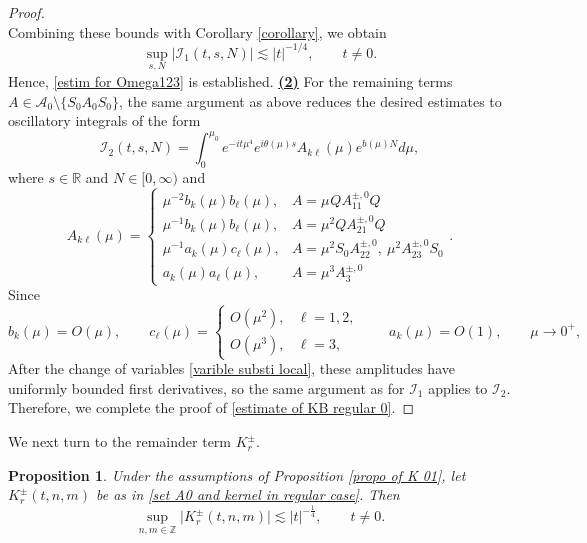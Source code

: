 \documentclass[reqno, 11pt]{amsart}
\newtheorem{proposition}[definition]{Proposition}
\newcommand\R{\mathbb{R}}
\newcommand\Z{\mathbb{Z}}
\newcommand\mcaI{\mathcal{I}}
\newcommand\mcaA{\mathcal{A}}
\numberwithin{equation}{section}
\begin{document}
\begin{proof}
\begin{equation}
\end{equation}
Combining these bounds with Corollary \ref{corollary}, we obtain
\begin{equation}\label{estimate of mcaI1}
\sup\limits_{s,N}|\mcaI_1(t,s,N)|\lesssim |t|^{-1/4},\qquad t\neq0.
\end{equation}
Hence, \eqref{estim for Omega123} is established.
\vskip0.2cm
{\underline{\bf(2)}} For the remaining terms
$A\in\mcaA_0\setminus\{S_0A_0S_0\}$, the same argument as above reduces the desired estimates to oscillatory integrals of the form
\begin{equation*}
\mcaI_{2}(t,s,N)=\int_{0}^{\mu_0}e^{-it\mu^4}e^{i\theta(\mu)s}A_{k\ell}(\mu)e^{b(\mu)N}d\mu,
\end{equation*}
where $s\in\R$ and $N\in[0,\infty)$ and
\begin{equation*}
    A_{k\ell}(\mu)=\begin{cases}
    \mu^{-2}b_k(\mu)b_{\ell}(\mu),&A=\mu^{} QA^{\pm,0}_{11}Q \\
    \mu^{-1}b_k(\mu)b_{\ell}(\mu),&A=\mu^2 QA^{\pm,0}_{21}Q \\
    \mu^{-1}a_k(\mu)c_{\ell}(\mu), &A=\mu^2S_0A^{\pm,0}_{22},\ \mu^2A^{\pm,0}_{23}S_0\\
       a_k(\mu)a_{\ell}(\mu),&A=\mu^3A^{\pm,0}_3
    \end{cases}.
\end{equation*}
Since 
\begin{equation}\label{expan of abc}
    b_k(\mu)=O(\mu),\qquad
c_\ell(\mu)=
\begin{cases}
O(\mu^2),&\ell=1,2,\\
O(\mu^3),&\ell=3,
\end{cases}
\qquad
a_k(\mu)=O(1), \qquad\mu\rightarrow0^+,
\end{equation}
After the change of variables \eqref{varible substi local}, these amplitudes have uniformly bounded first derivatives, so the same argument as for $\mcaI_1$ applies to $\mcaI_2$. Therefore, we complete the proof of \eqref{estimate of KB regular 0}.
\end{proof}
We next turn to the remainder term $K^{\pm}_{r}$.
\begin{proposition}\label{propo of K4 0}
Under the assumptions of Proposition \ref{propo of K 01}, let $K^{\pm}_{r}(t,n,m)$ be as in \eqref{set A0 and kernel in regular case}. Then
\begin{equation}\label{estimate of Kr0}
\sup\limits_{n,m\in\Z}\big|K^{\pm}_r(t,n,m)\big|\lesssim |t|^{-\frac{1}{4}},\qquad t\neq0.
\end{equation}
\end{proposition}
\end{document}
